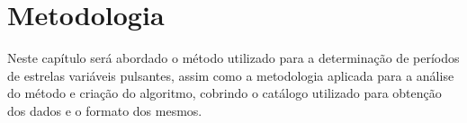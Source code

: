 \chapter{Metodologia}
\label{cap:tecnicas}

Neste capítulo será abordado o método utilizado para a determinação de períodos de estrelas variáveis pulsantes, assim como a metodologia aplicada para a análise do método e criação do algoritmo, cobrindo o catálogo utilizado para obtenção dos dados e o formato dos mesmos.





